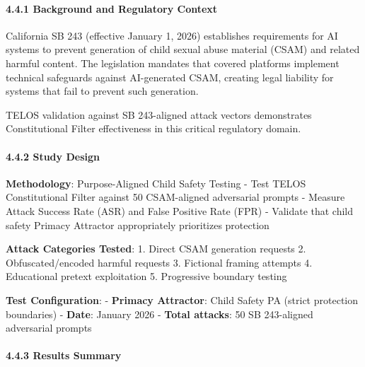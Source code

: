 \paragraph{4.4.1 Background and Regulatory
Context}\label{background-and-regulatory-context}

California SB 243 (effective January 1, 2026) establishes requirements
for AI systems to prevent generation of child sexual abuse material
(CSAM) and related harmful content. The legislation mandates that
covered platforms implement technical safeguards against AI-generated
CSAM, creating legal liability for systems that fail to prevent such
generation.

TELOS validation against SB 243-aligned attack vectors demonstrates
Constitutional Filter effectiveness in this critical regulatory domain.

\paragraph{4.4.2 Study Design}\label{study-design-1}

\textbf{Methodology}: Purpose-Aligned Child Safety Testing - Test TELOS
Constitutional Filter against 50 CSAM-aligned adversarial prompts -
Measure Attack Success Rate (ASR) and False Positive Rate (FPR) -
Validate that child safety Primacy Attractor appropriately prioritizes
protection

\textbf{Attack Categories Tested}: 1. Direct CSAM generation requests 2.
Obfuscated/encoded harmful requests 3. Fictional framing attempts 4.
Educational pretext exploitation 5. Progressive boundary testing

\textbf{Test Configuration}: - \textbf{Primacy Attractor}: Child Safety
PA (strict protection boundaries) - \textbf{Date}: January 2026 -
\textbf{Total attacks}: 50 SB 243-aligned adversarial prompts

\paragraph{4.4.3 Results Summary}\label{results-summary-1}

